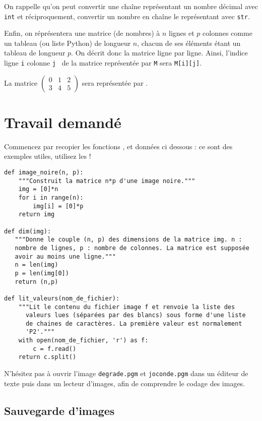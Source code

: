 On rappelle qu'on peut convertir une chaîne représentant un nombre
décimal avec \texttt{int} et réciproquement, convertir un nombre en chaîne
le représentant avec \texttt{str}.


Enfin, on réprésentera une matrice (de nombres) à $n$ lignes et $p$ colonnes comme un tableau (ou liste Python) de longueur $n$, chacun de ses éléments étant un tableau de longueur $p$. On décrit donc la matrice ligne par ligne. 
Ainsi, l'indice \og ligne \texttt{i} colonne \texttt{j} \fg\ de la matrice représentée par \texttt{M} sera \texttt{M[i][j]}.
\begin{exemple}
  La matrice $\begin{pmatrix} 0&1&2 \\ 3&4&5 \end{pmatrix}$ sera représentée par \pyv{[ [0,1,2] , [3,4,5] ]}.
\end{exemple}

\section{Travail demandé}

Commencez par recopier les fonctions  ,  et   données ci dessous : ce sont des exemples utiles, utilisez les ! 

\begin{lstlisting}
def image_noire(n, p):
    """Construit la matrice n*p d'une image noire."""
    img = [0]*n
    for i in range(n):
        img[i] = [0]*p
    return img
    
def dim(img):
   """Donne le couple (n, p) des dimensions de la matrice img. n :
   nombre de lignes, p : nombre de colonnes. La matrice est supposée
   avoir au moins une ligne."""
   n = len(img)
   p = len(img[0])
   return (n,p)
   
def lit_valeurs(nom_de_fichier):
    """Lit le contenu du fichier image f et renvoie la liste des
      valeurs lues (séparées par des blancs) sous forme d'une liste
      de chaines de caractères. La première valeur est normalement
      'P2'."""
    with open(nom_de_fichier, 'r') as f:
        c = f.read()
    return c.split()
\end{lstlisting}


N'hésitez pas à ouvrir l'image \texttt{degrade.pgm} et \texttt{joconde.pgm} dans un éditeur de texte puis dans un lecteur d'images, afin de comprendre le codage des images.


\subsection{Sauvegarde d'images}

